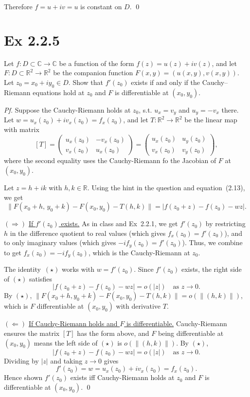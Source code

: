 \documentclass[a4paper]{article}
\begin{document}
Therefore $f = u + iv = u$ is constant on $D$. \qed

\newpage
\section*{Ex 2.2.5}

\begin{tcolorbox}[colback=gray!10, colframe=black, boxrule=0.5pt, arc=2mm]
Let $f : D \subset \mathbb{C} \to \mathbb{C}$ be a function of the form $f(z) = u(z) + iv(z)$, and let $F : D \subset \mathbb{R}^2 \to \mathbb{R}^2$ be the companion function $F(x,y) = (u(x,y), v(x,y))$. Let $z_0 = x_0 + iy_0 \in D$. Show that $f'(z_0)$ exists if and only if the Cauchy--Riemann equations hold at $z_0$ and $F$ is differentiable at $(x_0,y_0)$.
\end{tcolorbox}

\textit{Pf.} Suppose the Cauchy-Riemann holds at $z_0$, s.t. $u_x = v_y$ and $u_y = -v_x$ there.  Let $w = u_x(z_0) + iv_x(z_0) = f_x(z_0)$, and let $T : \mathbb{R}^2 \to \mathbb{R}^2$ be the linear map with matrix
\[
[T] = \begin{pmatrix} u_x(z_0) & -v_x(z_0) \\ v_x(z_0) & u_x(z_0) \end{pmatrix} = \begin{pmatrix} u_x(z_0) & u_y(z_0) \\ v_x(z_0) & v_y(z_0) \end{pmatrix},
\]
where the second equality uses the Cauchy-Riemann fo the Jacobian of $F$ at $(x_0, y_0)$.

\medskip
Let $z = h + ik$ with $h, k \in \mathbb{R}$.  Using the hint in the question and equation~(2.13), we get
\begin{equation}\tag{$\star$}
\|F(x_0+h,\, y_0+k) - F(x_0,y_0) - T(h,k)\| = |f(z_0 + z) - f(z_0) - wz|.
\end{equation}

\medskip\noindent$(\Longrightarrow)$\;
\underline{If $f'(z_0)$ exists.}  As in class and Ex~2.2.1, we get $f'(z_0)$ by restricting $h$ in the difference quotient to real values (which gives $f_x(z_0) = f'(z_0)$), and to only imaginary values (which gives $-if_y(z_0) = f'(z_0)$).  Thus, we combine to get $f_x(z_0) = -if_y(z_0)$, which is the Cauchy-Riemann at $z_0$.

The identity~$(\star)$ works with $w = f'(z_0)$.  Since $f'(z_0)$ exists, the right side of $(\star)$ satisfies
\[
|f(z_0+z) - f(z_0) - wz| = o(|z|) \quad \text{as } z \to 0.
\]
By $(\star)$, $\|F(x_0+h,y_0+k) - F(x_0,y_0) - T(h,k)\| = o(\|(h,k)\|)$, which is $F$ differentiable at $(x_0,y_0)$ with derivative $T$.

\medskip\noindent$(\Longleftarrow)$\;
\underline{If Cauchy-Riemann holds and $F$ is differentiable.}  Cauchy-Riemann ensures the matrix $[T]$ has the form above, and $F$ being differentiable at $(x_0,y_0)$ means the left side of $(\star)$ is $o(\|(h,k)\|)$.  By $(\star)$,
\[
|f(z_0+z) - f(z_0) - wz| = o(|z|) \quad \text{as } z \to 0.
\]
Dividing by $|z|$ and taking $z \to 0$ gives
\[
f'(z_0) = w = u_x(z_0) + iv_x(z_0) = f_x(z_0).
\]
Hence shown $f'(z_0)$ exists iff Cauchy-Riemann holds at $z_0$ and $F$ is differentiable at $(x_0,y_0)$. \qed
\end{document}
